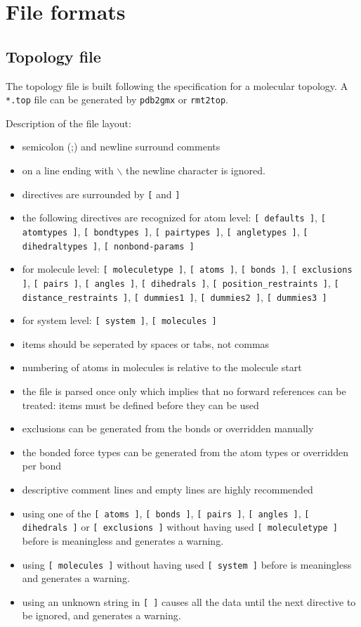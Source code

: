 \section{File formats}
\subsection{Topology file}
\label{subsec:topfile}
The topology file is built following the {\gromacs} specification for a
molecular topology.  A \verb'*.top' file can be generated by
\verb'pdb2gmx' or \verb'rmt2top'.

Description of the file layout:
\begin{itemize}
\item semicolon (;) and newline surround comments
\item on a line ending with $\backslash$ the newline character is ignored.
\item directives are surrounded by \verb'[' and \verb']'
\item \raggedright
      the following directives are recognized for atom level:
      \verb'[ defaults ]', \verb'[ atomtypes ]', \verb'[ bondtypes ]',
      \verb'[ pairtypes ]', \verb'[ angletypes ]', 
      \verb'[ dihedraltypes ]', \verb'[ nonbond-params ]'
\item \raggedright
      for molecule level: \verb'[ moleculetype ]', \verb'[ atoms ]', 
      \verb'[ bonds ]', \verb'[ exclusions ]', \verb'[ pairs ]', 
      \verb'[ angles ]', \verb'[ dihedrals ]', 
      \verb'[ position_restraints ]', 
      \verb'[ distance_restraints ]', 
      \verb'[ dummies1 ]', \verb'[ dummies2 ]', \verb'[ dummies3 ]'
\item for system level: \verb'[ system ]', \verb'[ molecules ]'
\item items should be seperated by spaces or tabs, not commas
\item numbering of atoms in molecules is relative to the molecule start
\item the file is parsed once only which implies that no forward
      references can be treated: items must be defined before they
      can be used
\item exclusions can be generated from the bonds or
      overridden manually
\item the bonded force types can be generated from the atom types or
      overridden per bond
\item descriptive comment lines and empty lines are highly recommended
\item using one of the \verb'[ atoms ]', \verb'[ bonds ]', 
      \verb'[ pairs ]', \verb'[ angles ]', \verb'[ dihedrals ]' or
      \verb'[ exclusions ]' without having used 
      \verb'[ moleculetype ]' 
      before is meaningless and generates a warning.
\item using \verb'[ molecules ]' without having used
      \verb'[ system ]' before is meaningless and generates a warning.
\item using an unknown string in \verb'[ ]' causes all the data until
      the next directive to be ignored, and generates a warning.
\end{itemize}

